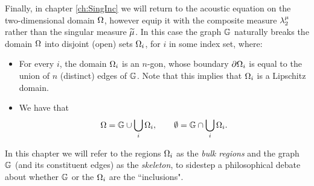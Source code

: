 Finally, in chapter \ref{ch:SingInc} we will return to the acoustic equation on the two-dimensional domain $\Omega$, however equip it with the composite measure $\lambda_2^{\mu}$ rather than the singular measure $\widetilde{\mu}$.
In this case the graph $\mathbb{G}$ naturally breaks the domain $\Omega$ into disjoint (open) sets $\Omega_i$, for $i$ in some index set, where:
\begin{itemize}
	\item For every $i$, the domain $\Omega_i$ is an $n$-gon, whose boundary $\partial\Omega_i$ is equal to the union of $n$ (distinct) edges of $\mathbb{G}$.
	Note that this implies that $\Omega_i$ is a Lipschitz domain.
	\item We have that
	\begin{align*}
		\Omega = \mathbb{G} \cup \bigcup_{i}\Omega_i,
		\qquad
		\emptyset = \mathbb{G} \cap \bigcup_{i}\Omega_i.
	\end{align*}
\end{itemize}
In this chapter we will refer to the regions $\Omega_i$ as the \emph{bulk regions} and the graph $\mathbb{G}$ (and its constituent edges) as the \emph{skeleton}, to sidestep a philosophical debate about whether $\mathbb{G}$ or the $\Omega_i$ are the ``inclusions".